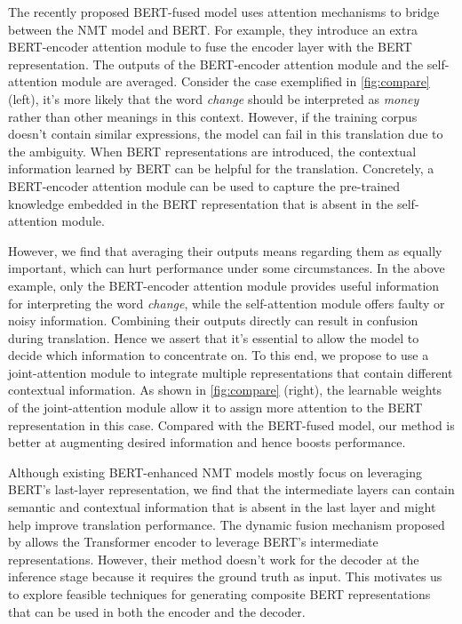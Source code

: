 \documentclass[review]{elsarticle}
\begin{document}
The recently proposed BERT-fused model \cite{Zhu20} uses attention mechanisms to bridge between the NMT model and BERT. For example, they introduce an extra BERT-encoder attention module to fuse the encoder layer with the BERT representation. The outputs of the BERT-encoder attention module and the self-attention module are averaged. 
Consider the case exemplified in \cref{fig:compare} (left), it's more likely that the word \emph{change} should be interpreted as \emph{money} rather than other meanings in this context. However, if the training corpus doesn't contain similar expressions, the model can fail in this translation due to the ambiguity. When BERT representations are introduced, the contextual information learned by BERT can be helpful for the translation. Concretely, a BERT-encoder attention module can be used to capture the pre-trained knowledge embedded in the BERT representation that is absent in the self-attention module. 

However, we find that averaging their outputs means regarding them as equally important, which can hurt performance under some circumstances. In the above example, only the BERT-encoder attention module provides useful information for interpreting the word \emph{change}, while the self-attention module offers faulty or noisy information. Combining their outputs directly can result in confusion during translation. 
Hence we assert that it's essential to allow the model to decide which information to concentrate on.
To this end, we propose to use a joint-attention module to integrate multiple representations that contain different contextual information. As shown in \cref{fig:compare} (right), the learnable weights of the joint-attention module allow it to assign more attention to the BERT representation in this case. Compared with the BERT-fused model, our method is better at augmenting desired information and hence boosts performance.


Although existing BERT-enhanced NMT models mostly focus on leveraging BERT's last-layer representation, we find that the intermediate layers can contain semantic and contextual information that is absent in the last layer and might help improve translation performance.
The dynamic fusion mechanism proposed by \citet{Weng20} allows the Transformer encoder to leverage BERT's intermediate representations. However, their method doesn't work for the decoder at the inference stage because it requires the ground truth as input.
This motivates us to explore feasible techniques for generating composite BERT representations that can be used in both the encoder and the decoder.
\end{document}
